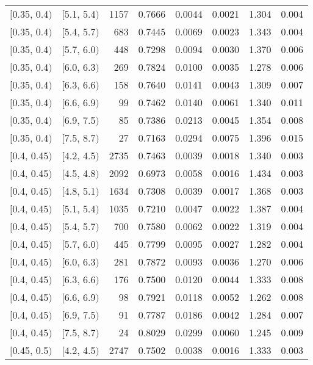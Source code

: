 \begin{longtable}{| l | l | r | r | r | r | r | r |}
        $[$0.35, 0.4$)$ & $[$5.1, 5.4$)$ & 1157 & 0.7666 & 0.0044 & 0.0021 & 1.304 & 0.004 \\
        $[$0.35, 0.4$)$ & $[$5.4, 5.7$)$ & 683 & 0.7445 & 0.0069 & 0.0023 & 1.343 & 0.004 \\
        $[$0.35, 0.4$)$ & $[$5.7, 6.0$)$ & 448 & 0.7298 & 0.0094 & 0.0030 & 1.370 & 0.006 \\
        $[$0.35, 0.4$)$ & $[$6.0, 6.3$)$ & 269 & 0.7824 & 0.0100 & 0.0035 & 1.278 & 0.006 \\
        $[$0.35, 0.4$)$ & $[$6.3, 6.6$)$ & 158 & 0.7640 & 0.0141 & 0.0043 & 1.309 & 0.007 \\
        $[$0.35, 0.4$)$ & $[$6.6, 6.9$)$ & 99 & 0.7462 & 0.0140 & 0.0061 & 1.340 & 0.011 \\
        $[$0.35, 0.4$)$ & $[$6.9, 7.5$)$ & 85 & 0.7386 & 0.0213 & 0.0045 & 1.354 & 0.008 \\
        $[$0.35, 0.4$)$ & $[$7.5, 8.7$)$ & 27 & 0.7163 & 0.0294 & 0.0075 & 1.396 & 0.015 \\
        $[$0.4, 0.45$)$ & $[$4.2, 4.5$)$ & 2735 & 0.7463 & 0.0039 & 0.0018 & 1.340 & 0.003 \\
        $[$0.4, 0.45$)$ & $[$4.5, 4.8$)$ & 2092 & 0.6973 & 0.0058 & 0.0016 & 1.434 & 0.003 \\
        $[$0.4, 0.45$)$ & $[$4.8, 5.1$)$ & 1634 & 0.7308 & 0.0039 & 0.0017 & 1.368 & 0.003 \\
        $[$0.4, 0.45$)$ & $[$5.1, 5.4$)$ & 1035 & 0.7210 & 0.0047 & 0.0022 & 1.387 & 0.004 \\
        $[$0.4, 0.45$)$ & $[$5.4, 5.7$)$ & 700 & 0.7580 & 0.0062 & 0.0022 & 1.319 & 0.004 \\
        $[$0.4, 0.45$)$ & $[$5.7, 6.0$)$ & 445 & 0.7799 & 0.0095 & 0.0027 & 1.282 & 0.004 \\
        $[$0.4, 0.45$)$ & $[$6.0, 6.3$)$ & 281 & 0.7872 & 0.0093 & 0.0036 & 1.270 & 0.006 \\
        $[$0.4, 0.45$)$ & $[$6.3, 6.6$)$ & 176 & 0.7500 & 0.0120 & 0.0044 & 1.333 & 0.008 \\
        $[$0.4, 0.45$)$ & $[$6.6, 6.9$)$ & 98 & 0.7921 & 0.0118 & 0.0052 & 1.262 & 0.008 \\
        $[$0.4, 0.45$)$ & $[$6.9, 7.5$)$ & 91 & 0.7787 & 0.0186 & 0.0042 & 1.284 & 0.007 \\
        $[$0.4, 0.45$)$ & $[$7.5, 8.7$)$ & 24 & 0.8029 & 0.0299 & 0.0060 & 1.245 & 0.009 \\
        $[$0.45, 0.5$)$ & $[$4.2, 4.5$)$ & 2747 & 0.7502 & 0.0038 & 0.0016 & 1.333 & 0.003 \\

\end{longtable}
